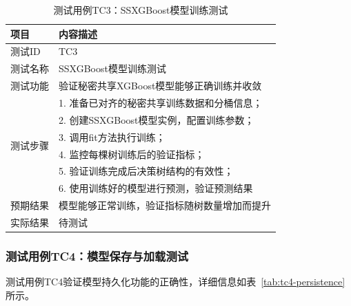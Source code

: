 \begin{table}[htbp]
    \centering
    \caption{测试用例TC3：SSXGBoost模型训练测试}
    \label{tab:tc3-ssxgboost}
    \begin{tabular}{lp{9cm}}
        \toprule
        \textbf{项目} & \textbf{内容描述} \\
        \midrule
        测试ID & TC3 \\
        测试名称 & SSXGBoost模型训练测试 \\
        测试功能 & 验证秘密共享XGBoost模型能够正确训练并收敛 \\
        \midrule
        \multirow{6}{*}{测试步骤} & 1. 准备已对齐的秘密共享训练数据和分桶信息； \\
        & 2. 创建SSXGBoost模型实例，配置训练参数； \\
        & 3. 调用fit方法执行训练； \\
        & 4. 监控每棵树训练后的验证指标； \\
        & 5. 验证训练完成后决策树结构的有效性； \\
        & 6. 使用训练好的模型进行预测，验证预测结果 \\
        \midrule
        预期结果 & 模型能够正常训练，验证指标随树数量增加而提升 \\
        实际结果 & 待测试 \\
        \bottomrule
    \end{tabular}
\end{table}

\subsubsection{测试用例TC4：模型保存与加载测试}

测试用例TC4验证模型持久化功能的正确性，详细信息如表~\ref{tab:tc4-persistence}所示。

